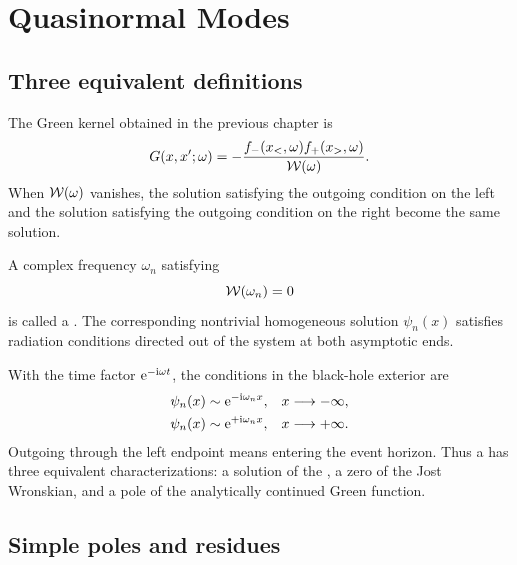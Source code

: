 \chapter{Quasinormal Modes}
\label{chap:qnm}

\section{Three equivalent definitions}

The Green kernel obtained in the previous chapter is
\begin{equation}
G(x,x';\omega)
=
-\frac{f_-(x_<,\omega)f_+(x_>,\omega)}{\mathcal{W}(\omega)}.
\label{eq:qnm-start-green}
\end{equation}
When $\mathcal{W}(\omega)$ vanishes, the solution satisfying the outgoing condition on the left and the solution satisfying the outgoing condition on the right become the same solution.

\begin{definition}
A complex frequency $\omega_n$ satisfying
\begin{equation}
\mathcal{W}(\omega_n)=0
\label{eq:qnm_wronskian_zero}
\end{equation}
is called a . The corresponding nontrivial homogeneous solution $\psi_n(x)$ satisfies radiation conditions directed out of the system at both asymptotic ends.
\end{definition}

With the time factor $\mathrm{e}^{-\mathrm{i}\omega t}$, the conditions in the black-hole exterior are
\begin{align}
\psi_n(x)
&\sim
\mathrm{e}^{-\mathrm{i}\omega_n x},
&&x\longrightarrow-\infty,
\label{eq:qnm_bc_left}
\\
\psi_n(x)
&\sim
\mathrm{e}^{+\mathrm{i}\omega_n x},
&&x\longrightarrow+\infty.
\label{eq:qnm_bc_right}
\end{align}
Outgoing through the left endpoint means entering the event horizon. Thus a  has three equivalent characterizations: a solution of the , a zero of the Jost Wronskian, and a pole of the analytically continued Green function.

\section{Simple poles and residues}


